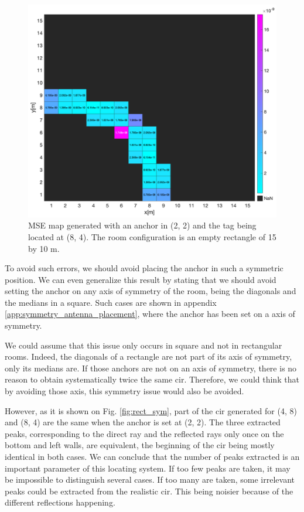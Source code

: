 \begin{figure}[H]
\centering
\includegraphics[width=.9\linewidth]{Images/square_sym_mse_4_8.png}
\caption{MSE map generated with an anchor in (2, 2) and the tag being located at (8, 4). The room configuration is an empty rectangle of 15 by 10 m.  \label{fig:square_sym_cir_comparison}}
\end{figure} 

To avoid such errors, we should avoid placing the anchor in such a symmetric position. We can even generalize this result by stating that we should avoid setting the anchor on any axis of symmetry of the room, being the diagonals and the medians in a square. Such cases are shown in appendix \ref{app:symmetry_antenna_placement}, where the anchor has been set on a axis of symmetry.
\vspace{2mm}

We could assume that this issue only occurs in square and not in rectangular rooms. Indeed, the diagonals of a rectangle are not part of its axis of symmetry, only its medians are. If those anchors are not on an axis of symmetry, there is no reason to obtain systematically twice the same \gls{cir}. Therefore, we could think that by avoiding those axis, this symmetry issue would also be avoided.
\vspace{2mm}

However, as it is shown on Fig. \ref{fig:rect_sym}, part of the \gls{cir} generated for (4, 8) and (8, 4) are the same when the anchor is set at (2, 2). The three extracted peaks, corresponding to the direct ray and the reflected rays only once on the bottom and left walls, are equivalent, the beginning of the \gls{cir} being mostly identical in both cases. We can conclude that the number of peaks extracted is an important parameter of this locating system. If too few peaks are taken, it may be impossible to distinguish several cases. If too many are taken, some irrelevant peaks could be extracted from the realistic \gls{cir}. This being noisier because of the different reflections happening.

